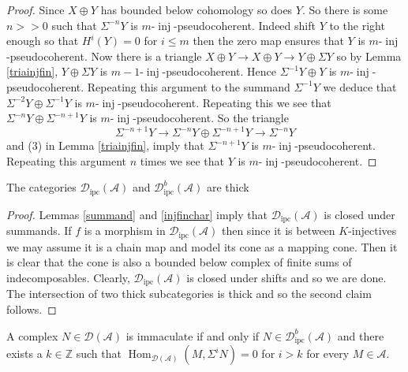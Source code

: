 \documentclass[12pt,oneside]{amsart}
\DeclareMathOperator{\Hom}{Hom}
\DeclareMathOperator{\inj}{inj}
\DeclareMathOperator{\ipscoh}{ipc}
\begin{document}
\begin{proof} Since $X \oplus Y$ has bounded below cohomology so does $Y$. So there is some $n >> 0$ such that $\Sigma^{-n} Y$ is $m$-$\inj$-pseudocoherent. Indeed shift $Y$ to the right enough so that $H^i(Y) = 0$ for $i \leq m$ then the zero map ensures that $Y$ is $m$-$\inj$-pseudocoherent. Now there is a triangle $X \oplus Y \to X \oplus Y \to Y \oplus \Sigma Y$ so by Lemma \ref{triainjfin}, $Y \oplus \Sigma Y$ is $m-1$-$\inj$-pseudocoherent. Hence $\Sigma^{-1} Y \oplus Y$ is $m$-$\inj$-pseudocoherent. Repeating this argument to the summand $\Sigma^{-1} Y$ we deduce that $\Sigma^{-2} Y \oplus \Sigma^{-1} Y$ is $m$-$\inj$-pseudocoherent. Repeating this we see that $\Sigma^{-n} Y \oplus \Sigma^{-n+1 }Y$ is $m$-$\inj$-pseudocoherent. So the triangle 
\[
\Sigma^{-n+1} Y \to \Sigma^{-n} Y \oplus \Sigma^{-n+1} Y \to \Sigma^{-n} Y
\]
and (3) in Lemma \ref{triainjfin}, imply that $\Sigma^{-n+1} Y$ is $m$-$\inj$-pseudocoherent. Repeating this argument $n$ times we see that $Y$ is $m$-$\inj$-pseudocoherent.
\end{proof}

\begin{cor} \label{injfinthick}
The categories $\mathcal{D}_{\ipscoh}(\mathcal{A})$ and $\mathcal{D}^b_{\ipscoh}(\mathcal{A})$ are thick
\end{cor}

\begin{proof}
Lemmas \ref{summand} and \ref{injfinchar} imply that $\mathcal{D}_{\ipscoh}(\mathcal{A})$ is closed under summands. If $f$ is a morphism in $\mathcal{D}_{\ipscoh}(\mathcal{A})$ then since it is between $K$-injectives we may assume it is a chain map and model its cone as a mapping cone. Then it is clear that the cone is also a bounded below complex of finite sums of indecomposables. Clearly, $\mathcal{D}_{\ipscoh}(\mathcal{A})$ is closed under shifts and so we are done. The intersection of two thick subcategories is thick and so the second claim follows. 
\end{proof}


\begin{lemma} \label{immacchar}
A complex $N \in \mathcal{D}(\mathcal{A})$ is immaculate if and only if $N \in \mathcal{D}^b_{\ipscoh}(\mathcal{A})$ and there exists a $k \in \mathbb{Z}$ such that $\Hom_{\mathcal{D}(\mathcal{A})}(M,\Sigma^i N) = 0$ for $i >k$ for every $M \in \mathcal{A}$. 
\end{lemma}
\end{document}
